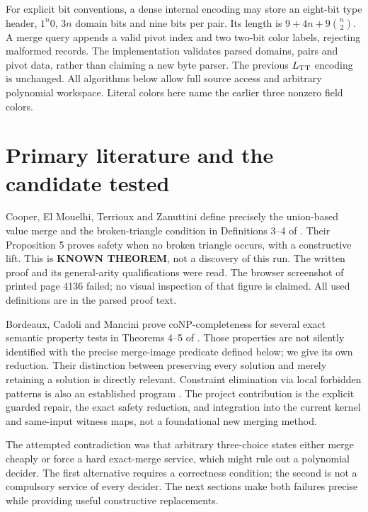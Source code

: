 \documentclass[11pt]{article}
\begin{document}
For explicit bit conventions, a dense internal encoding may store an
eight-bit type header, $1^n0$, $3n$ domain bits and nine bits per pair. Its
length is $9+4n+9\binom n2$. A merge query appends a valid pivot index and
two two-bit color labels, rejecting malformed records. The implementation
validates parsed domains, pairs and pivot data, rather than claiming a new
byte parser. The previous $L_{\rm TT}$ encoding is unchanged. All algorithms
below allow full source access and arbitrary polynomial workspace. Literal
colors here name the earlier three nonzero field colors.

\section{Primary literature and the candidate tested}
Cooper, El Mouelhi, Terrioux and Zanuttini define precisely the union-based
value merge and the broken-triangle condition in Definitions 3--4 of
\cite{btp}. Their Proposition 5 proves safety when no broken triangle occurs,
with a constructive lift. This is \textbf{KNOWN THEOREM}, not a discovery of
this run. The written proof and its general-arity qualifications were read.
The browser screenshot of printed page 4136 failed; no visual inspection of
that figure is claimed. All used definitions are in the parsed proof text.

Bordeaux, Cadoli and Mancini prove coNP-completeness for several exact
semantic property tests in Theorems 4--5 of \cite{bcm}. Those properties are
not silently identified with the precise merge-image predicate defined below;
we give its own reduction. Their distinction between preserving every
solution and merely retaining a solution is directly relevant. Constraint
elimination via local forbidden patterns is also an established program
\cite{patterns}. The project contribution is the explicit guarded repair,
the exact safety reduction, and integration into the current kernel and
same-input witness maps, not a foundational new merging method.

The attempted contradiction was that arbitrary three-choice states either
merge cheaply or force a hard exact-merge service, which might rule out a
polynomial decider. The first alternative requires a correctness condition;
the second is not a compulsory service of every decider. The next sections
make both failures precise while providing useful constructive replacements.
\end{document}
